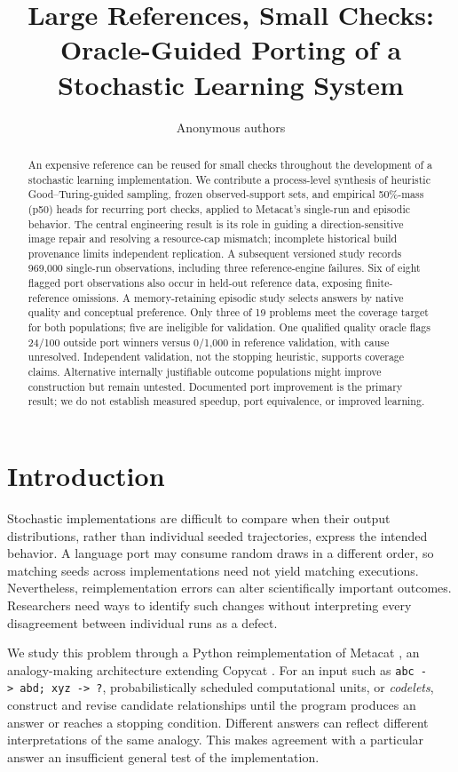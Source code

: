 \documentclass[10pt,letterpaper]{article}
\title{Large References, Small Checks: Oracle-Guided Porting of a Stochastic Learning
System}
\author{Anonymous authors}
\begin{document}
\maketitle
\begin{abstract}
An expensive reference can be reused for small checks throughout the development of a
stochastic learning implementation. We contribute a process-level synthesis of heuristic
Good--Turing-guided sampling, frozen observed-support sets, and empirical 50\%-mass (p50)
heads for recurring port checks, applied to Metacat's single-run and episodic behavior.
The central engineering result is its role in guiding a direction-sensitive image repair
and resolving a resource-cap mismatch; incomplete historical build provenance limits
independent replication. A subsequent versioned study records 969,000 single-run
observations, including three reference-engine failures. Six of eight flagged port
observations also occur in held-out reference data, exposing finite-reference omissions. A
memory-retaining episodic study selects answers by native quality and conceptual
preference. Only three of 19 problems meet the coverage target for both populations; five
are ineligible for validation. One qualified quality oracle flags 24/100 outside port
winners versus 0/1,000 in reference validation, with cause unresolved. Independent
validation, not the stopping heuristic, supports coverage claims. Alternative internally
justifiable outcome populations might improve construction but remain untested. Documented
port improvement is the primary result; we do not establish measured speedup, port
equivalence, or improved learning.
\end{abstract}
\section{Introduction}\label{sec:introduction}

Stochastic implementations are difficult to compare when their output distributions,
rather than individual seeded trajectories, express the intended behavior. A language port
may consume random draws in a different order, so matching seeds across implementations
need not yield matching executions. Nevertheless, reimplementation errors can alter
scientifically important outcomes. Researchers need ways to identify such changes without
interpreting every disagreement between individual runs as a defect.

We study this problem through a Python reimplementation of Metacat \citep{ref21, ref22},
an analogy-making architecture extending Copycat \citep{ref23, ref24}. For an input such
as \texttt{abc\ -\textgreater{}\ abd;\ xyz\ -\textgreater{}\ ?}, probabilistically
scheduled computational units, or \emph{codelets}, construct and revise candidate
relationships until the program produces an answer or reaches a stopping condition.
Different answers can reflect different interpretations of the same analogy. This makes
agreement with a particular answer an insufficient general test of the implementation.
\end{document}
